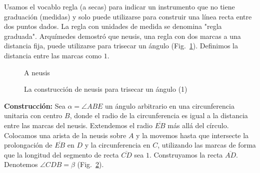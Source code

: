 Usamos el vocablo regla (a secas) para indicar un instrumento que no tiene graduación (medidas) y solo puede utilizarse para construir una línea recta entre dos puntos dados. La regla con unidades de medida se denomina "regla graduada". Arquímedes demostró que neusis, una regla con dos marcas a una distancia fija, puede utilizarse para trisecar un ángulo (Fig.~\ref{f.neusis}). Definimos la distancia entre las marcas como $1$.

\begin{figure}[b]
\begin{center}
\end{center}
\caption{A neusis}\label{f.neusis}
\end{figure}

\begin{figure}[t]
\begin{center}
\end{center}
\caption{La construcción de neusis para trisecar un ángulo (1)}\label{f.trisect-neusis-1}
\end{figure}

\noindent\textbf{Construcción:}
Sea $\alpha=\angle ABE$ un ángulo arbitrario en una circunferencia unitaria con centro $B$, donde el radio de la circunferencia es igual a la distancia entre las marcas del neusis. Extendemos el radio $\overline{EB}$ más allá del círculo. Colocamos una arista de la neusis sobre $A$ y la movemos hasta que intersecte la prolongación de $\overline{EB}$ en $D$ y la circunferencia en $C$, utilizando las marcas de forma que la longitud del segmento de recta $\overline{CD}$ sea $1$. Construyamos la recta $\overline{AD}$. Denotemos $\angle CDB=\beta$ (Fig.~\ref{f.trisect-neusis-1}).

